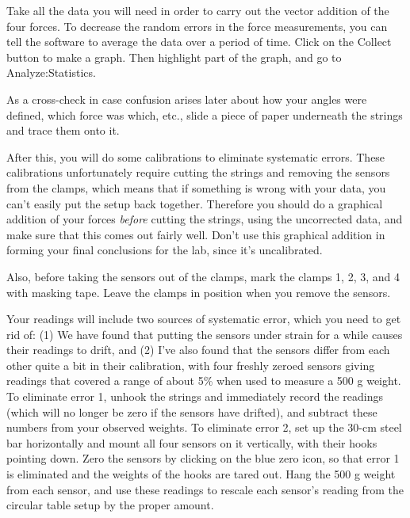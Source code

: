 Take all the data you will need in order to carry out the vector addition of the four forces.
To decrease the random errors in the force measurements, you can tell the software to average
the data over a period of time. Click on the Collect button to make a graph.
Then highlight part of the graph, and go to Analyze:Statistics.

As a cross-check in case confusion arises later about how your angles were defined, which
force was which, etc., slide a piece of paper underneath the strings and trace them onto it.

After this, you will do some calibrations to eliminate systematic errors. These calibrations
unfortunately require cutting the strings and removing the sensors from the clamps,
which means that if something is wrong with your
data, you can't easily put the setup back together. Therefore you should do a graphical
addition of your forces \emph{before} cutting the strings, using the uncorrected data,
and make sure that this comes out fairly well. Don't use this graphical addition in forming
your final conclusions for the lab, since it's uncalibrated.

Also, before taking the sensors out of the clamps,
mark the clamps 1, 2, 3, and 4 with masking tape. Leave the clamps in position when you remove the
sensors.

Your readings will include two sources of systematic error, which you need
to get rid of: (1) We have found that putting the
sensors under strain for a while causes their readings to drift, and (2)
I've also found that the sensors differ from each other quite a bit in their
calibration, with four freshly zeroed sensors giving readings
that covered a range of about 5\% when used to measure a 500 g weight.
To eliminate error 1, unhook the strings and immediately record the readings (which
will no longer be zero if the sensors have drifted), and subtract these
numbers from your observed weights. To eliminate error 2, set up the 30-cm steel bar
horizontally and mount all four sensors on it vertically, with their hooks pointing down.
Zero the sensors by clicking on the blue zero icon, so that error 1 is eliminated and the weights of the hooks are tared out.
Hang the 500 g weight from each sensor, and use these readings to
rescale each sensor's reading from the circular table setup by the proper amount.


\prelab

